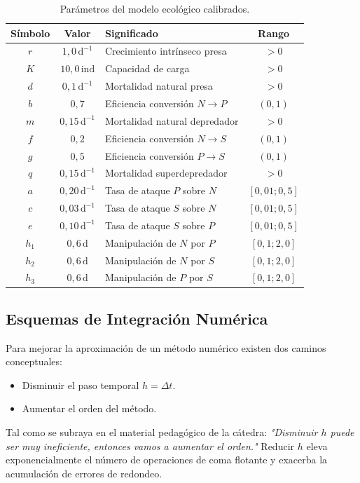 \documentclass[10pt,twocolumn,a4paper]{article}
\begin{document}
\begin{table}[htbp]
\centering
\caption{Parámetros del modelo ecológico calibrados.}
\label{tab:parametros}
\footnotesize
\begin{tabular}{c c l c}
\toprule
\textbf{Símbolo} & \textbf{Valor} & \textbf{Significado} & \textbf{Rango} \\
\midrule
$r$   & $1{,}0\,\text{d}^{-1}$   & Crecimiento intrínseco presa    & $> 0$ \\
$K$   & $10{,}0\,\text{ind}$     & Capacidad de carga              & $> 0$ \\
$d$   & $0{,}1\,\text{d}^{-1}$   & Mortalidad natural presa        & $> 0$ \\
$b$   & $0{,}7$                  & Eficiencia conversión $N \to P$ & $(0,1)$ \\
$m$   & $0{,}15\,\text{d}^{-1}$  & Mortalidad natural depredador   & $> 0$ \\
$f$   & $0{,}2$                  & Eficiencia conversión $N \to S$ & $(0,1)$ \\
$g$   & $0{,}5$                  & Eficiencia conversión $P \to S$ & $(0,1)$ \\
$q$   & $0{,}15\,\text{d}^{-1}$  & Mortalidad superdepredador      & $> 0$ \\
$a$   & $0{,}20\,\text{d}^{-1}$  & Tasa de ataque $P$ sobre $N$    & $[0{,}01; 0{,}5]$ \\
$c$   & $0{,}03\,\text{d}^{-1}$  & Tasa de ataque $S$ sobre $N$    & $[0{,}01; 0{,}5]$ \\
$e$   & $0{,}10\,\text{d}^{-1}$  & Tasa de ataque $S$ sobre $P$    & $[0{,}01; 0{,}5]$ \\
$h_1$ & $0{,}6\,\text{d}$        & Manipulación de $N$ por $P$     & $[0{,}1; 2{,}0]$ \\
$h_2$ & $0{,}6\,\text{d}$        & Manipulación de $N$ por $S$     & $[0{,}1; 2{,}0]$ \\
$h_3$ & $0{,}6\,\text{d}$        & Manipulación de $P$ por $S$     & $[0{,}1; 2{,}0]$ \\
\bottomrule
\end{tabular}
\end{table}

\subsection{Esquemas de Integración Numérica}
Para mejorar la aproximación de un método numérico existen dos caminos conceptuales:
\begin{itemize}
  \item Disminuir el paso temporal $h = \Delta t$.
  \item Aumentar el orden del método.
\end{itemize}
Tal como se subraya en el material pedagógico de la cátedra: \textit{"Disminuir $h$ puede ser muy ineficiente, entonces vamos a aumentar el orden."} Reducir $h$ eleva exponencialmente el número de operaciones de coma flotante y exacerba la acumulación de errores de redondeo.
\end{document}
